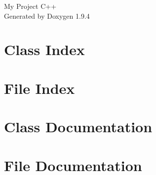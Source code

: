 \documentclass[twoside]{book}
\newcommand{\+}{\discretionary{\mbox{\scriptsize$\hookleftarrow$}}{}{}}
\newcommand{\clearemptydoublepage}{%
    \newpage{\pagestyle{empty}\cleardoublepage}%
  }
\begin{document}
  \raggedbottom
    \hypersetup{pageanchor=false,
                bookmarksnumbered=true,
                pdfencoding=unicode
               }
  \begin{titlepage}
  \vspace*{7cm}
  \begin{center}%
  {\Large My Project C++}\\
  \vspace*{1cm}
  {\large Generated by Doxygen 1.9.4}\\
  \end{center}
  \end{titlepage}
  \clearemptydoublepage
  \tableofcontents
  \clearemptydoublepage
  \hypersetup{pageanchor=true}
\chapter{Class Index}

\chapter{File Index}

\chapter{Class Documentation}


\chapter{File Documentation}

  \backmatter
  \newpage
  \clearemptydoublepage
  \printindex
\end{document}
